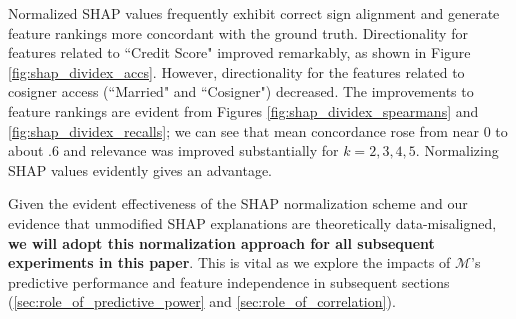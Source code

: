 \documentclass[12pt]{article}  %
\begin{document}
             Normalized SHAP values frequently exhibit correct sign alignment and generate feature rankings more concordant with the ground truth. Directionality for features related to ``Credit Score" improved remarkably, as shown in Figure \ref{fig:shap_dividex_accs}. However, directionality for the features related to cosigner access (``Married" and ``Cosigner") decreased. The improvements to feature rankings are evident from Figures \ref{fig:shap_dividex_spearmans} and \ref{fig:shap_dividex_recalls}; we can see that mean concordance rose from near 0 to about .6 and relevance was improved substantially for $k=2,3,4,5$. Normalizing SHAP values evidently gives an advantage.
             
            
             Given the evident effectiveness of the SHAP normalization scheme and our evidence that unmodified SHAP explanations are theoretically  data-misaligned, \textbf{we will adopt this normalization approach for all subsequent experiments in this paper}. This is vital as we explore the impacts of $\mathcal{M}$'s predictive performance and feature independence in subsequent sections (\ref{sec:role_of_predictive_power} and \ref{sec:role_of_correlation}). %
\end{document}
